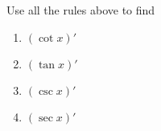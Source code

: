 \documentclass[12pt]{amsart}
\begin{document}
\begin{question}
	Use all the rules above to find
	\begin{enumerate}
		\item $\displaystyle (\cot x)'$
		      \vspace{5cm}
		\item $\displaystyle (\tan x)'$
		      \vspace{5cm}
		\item $\displaystyle (\csc x)'$
		      \vspace{5cm}
		\item $\displaystyle (\sec x)'$
		      \vspace{5cm}
	\end{enumerate}

\end{question}


\printbibliography
\end{document}
